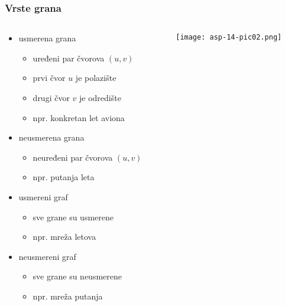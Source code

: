 \documentclass[compress,aspectratio=169]{beamer}
\begin{document}
\begin{frame}[fragile]
  \frametitle{Vrste grana}
  \begin{columns}
    \begin{column}[t]{8cm}
      \begin{itemize}
        \item usmerena grana
        \begin{itemize}
          \item uređeni par čvorova $(u,v)$
          \item prvi čvor $u$ je polazište
          \item drugi čvor $v$ je odredište
          \item npr. konkretan let aviona
        \end{itemize}
        \item neusmerena grana
        \begin{itemize}
          \item neuređeni par čvorova $(u,v)$
          \item npr. putanja leta
        \end{itemize}
        \item usmereni graf
        \begin{itemize}
          \item sve grane su usmerene
          \item npr. mreža letova
        \end{itemize}
        \item neusmereni graf
        \begin{itemize}
          \item sve grane su neusmerene
          \item npr. mreža putanja
        \end{itemize}
      \end{itemize}
    \end{column}
    \begin{column}[t]{4cm}
      \begin{center}
        \texttt{[image: asp-14-pic02.png]}
      \end{center}
    \end{column}
  \end{columns}
\end{frame}
\end{document}
